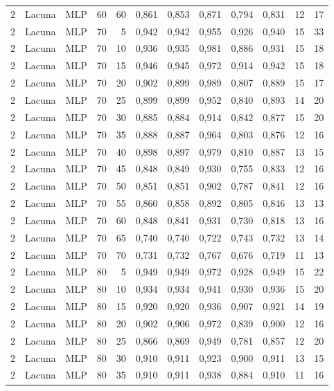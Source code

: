 \begin{longtable}{@{}rllrrrrrrrrr@{}}
2 & Lacuna & MLP & 60 & 60 & 0,861 & 0,853 & 0,871 & 0,794 & 0,831 & 12 & 17 \\
2 & Lacuna & MLP & 70 & 5 & 0,942 & 0,942 & 0,955 & 0,926 & 0,940 & 15 & 33 \\
2 & Lacuna & MLP & 70 & 10 & 0,936 & 0,935 & 0,981 & 0,886 & 0,931 & 15 & 18 \\
2 & Lacuna & MLP & 70 & 15 & 0,946 & 0,945 & 0,972 & 0,914 & 0,942 & 15 & 18 \\
2 & Lacuna & MLP & 70 & 20 & 0,902 & 0,899 & 0,989 & 0,807 & 0,889 & 15 & 17 \\
2 & Lacuna & MLP & 70 & 25 & 0,899 & 0,899 & 0,952 & 0,840 & 0,893 & 14 & 20 \\
2 & Lacuna & MLP & 70 & 30 & 0,885 & 0,884 & 0,914 & 0,842 & 0,877 & 15 & 20 \\
2 & Lacuna & MLP & 70 & 35 & 0,888 & 0,887 & 0,964 & 0,803 & 0,876 & 12 & 16 \\
2 & Lacuna & MLP & 70 & 40 & 0,898 & 0,897 & 0,979 & 0,810 & 0,887 & 13 & 15 \\
2 & Lacuna & MLP & 70 & 45 & 0,848 & 0,849 & 0,930 & 0,755 & 0,833 & 12 & 16 \\
2 & Lacuna & MLP & 70 & 50 & 0,851 & 0,851 & 0,902 & 0,787 & 0,841 & 12 & 16 \\
2 & Lacuna & MLP & 70 & 55 & 0,860 & 0,858 & 0,892 & 0,805 & 0,846 & 13 & 13 \\
2 & Lacuna & MLP & 70 & 60 & 0,848 & 0,841 & 0,931 & 0,730 & 0,818 & 13 & 16 \\
2 & Lacuna & MLP & 70 & 65 & 0,740 & 0,740 & 0,722 & 0,743 & 0,732 & 13 & 14 \\
2 & Lacuna & MLP & 70 & 70 & 0,731 & 0,732 & 0,767 & 0,676 & 0,719 & 11 & 13 \\
2 & Lacuna & MLP & 80 & 5 & 0,949 & 0,949 & 0,972 & 0,928 & 0,949 & 15 & 22 \\
2 & Lacuna & MLP & 80 & 10 & 0,934 & 0,934 & 0,941 & 0,930 & 0,936 & 15 & 20 \\
2 & Lacuna & MLP & 80 & 15 & 0,920 & 0,920 & 0,936 & 0,907 & 0,921 & 14 & 19 \\
2 & Lacuna & MLP & 80 & 20 & 0,902 & 0,906 & 0,972 & 0,839 & 0,900 & 12 & 16 \\
2 & Lacuna & MLP & 80 & 25 & 0,866 & 0,869 & 0,949 & 0,781 & 0,857 & 12 & 20 \\
2 & Lacuna & MLP & 80 & 30 & 0,910 & 0,911 & 0,923 & 0,900 & 0,911 & 13 & 15 \\
2 & Lacuna & MLP & 80 & 35 & 0,910 & 0,911 & 0,938 & 0,884 & 0,910 & 11 & 16 \\

\end{longtable}
